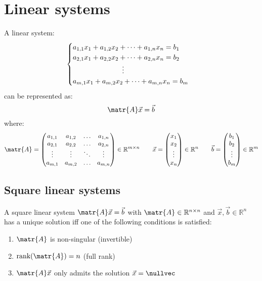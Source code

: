 \chapter{Linear systems}

A linear system:
\begin{equation*}
    \begin{cases}
        a_{1,1}x_1 + a_{1,2}x_2 + \dots + a_{1,n}x_n = b_1\\
        a_{2,1}x_1 + a_{2,2}x_2 + \dots + a_{2,n}x_n = b_2\\
        \hspace*{7em} \vdots \\
        a_{m,1}x_1 + a_{m,2}x_2 + \dots + a_{m,n}x_n = b_m\\
    \end{cases}
\end{equation*}
can be represented as:
\[ \matr{A}\vec{x} = \vec{b} \]
where:
\[
    \matr{A} = 
    \begin{pmatrix}
        a_{1,1} & a_{1, 2} & \hdots & a_{1,n} \\
        a_{2,1} & a_{2, 2} & \hdots & a_{2,n} \\
        \vdots  & \vdots   & \ddots & \vdots  \\
        a_{m,1} & a_{m, 2} & \hdots & a_{m,n}
    \end{pmatrix} \in \mathbb{R}^{m \times n}
    \hspace*{2em}
    \vec{x} = 
    \begin{pmatrix}
        x_1 \\
        x_2 \\ 
        \vdots \\
        x_n
    \end{pmatrix} \in \mathbb{R}^n
    \hspace*{2em}
    \vec{b} = 
    \begin{pmatrix}
        b_1 \\
        b_2 \\ 
        \vdots \\
        b_m
    \end{pmatrix} \in \mathbb{R}^m
\]
    


\section{Square linear systems}
A square linear system $\matr{A}\vec{x} = \vec{b}$ with $\matr{A} \in \mathbb{R}^{n \times n}$ and $\vec{x}, \vec{b} \in \mathbb{R}^n$
has a unique solution iff one of the following conditions is satisfied:
\begin{enumerate}
    \item $\matr{A}$ is non-singular (invertible)
    \item $\text{rank}(\matr{A}) = n$ (full rank)
    \item $\matr{A}\vec{x}$ only admits the solution $\vec{x} = \nullvec$
\end{enumerate}

